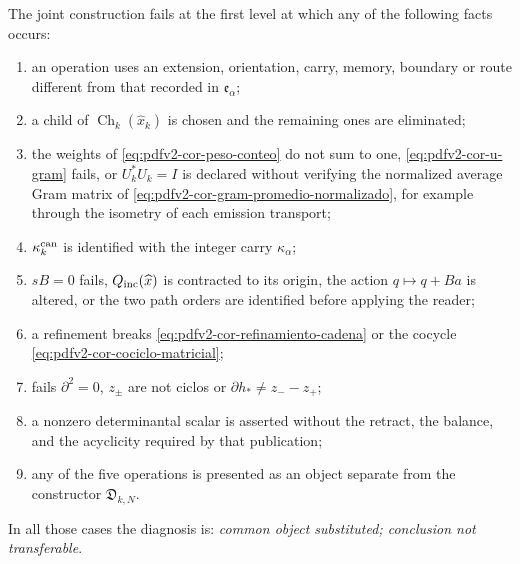 \begin{criterion}
\label{crit:pdfv2-cor-falsadores}
The joint construction fails at the first level at which any of the
following facts occurs:
\begin{enumerate}
 \item an operation uses an extension, orientation, carry, memory, boundary or route different from that recorded in \(\mathfrak e_\alpha\);
 \item a child of
 \(\operatorname{Ch}_k(\widehat x_k)\) is chosen and the remaining ones are eliminated;
 \item the weights of \eqref{eq:pdfv2-cor-peso-conteo} do not sum to one, \eqref{eq:pdfv2-cor-u-gram} fails, or \(U_k^*U_k=I\) is declared without verifying the normalized average Gram matrix of \eqref{eq:pdfv2-cor-gram-promedio-normalizado}, for example through the isometry of each emission transport;
 \item \(\kappa_k^{\rm can}\) is identified with the integer carry
 \(\kappa_\alpha\);
 \item \(sB=0\) fails, \(Q_{\rm inc}(\widehat x)\) is contracted
 to its origin, the action \(q\mapsto q+Ba\) is altered, or the two path orders are identified before
 applying the reader;
 \item a refinement breaks
 \eqref{eq:pdfv2-cor-refinamiento-cadena} or the cocycle
 \eqref{eq:pdfv2-cor-cociclo-matricial};
 \item fails \(\partial^2=0\), \(z_\pm\) are not ciclos or
 \(\partial h_*\neq z_--z_+\);
 \item a nonzero determinantal scalar is asserted without the retract, the
 balance, and the acyclicity required by that publication;
 \item any of the five operations is presented as an object
 separate from the constructor \(\mathfrak D_{k,N}\).
\end{enumerate}
In all those cases the diagnosis is: \emph{common object substituted;
conclusion not transferable}.
\end{criterion}
